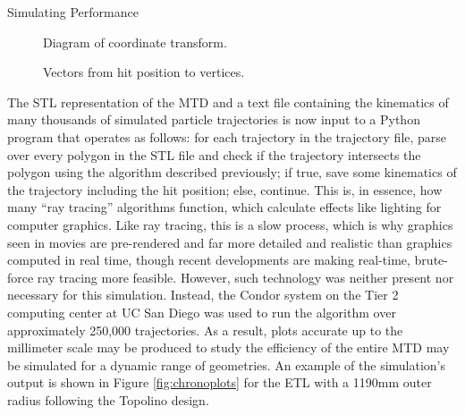 \begin{section}{Simulating Performance}
\begin{figure}[htb]
\begin{center}

\subfloat[Original]      {

}\quad
\subfloat[Primed]      {

}

\end{center}
\caption{Diagram of coordinate transform.}
\end{figure}

\begin{figure}[htb]
\label{fig:vectors}
\begin{center}

\subfloat[Inside]      {

}\quad
\subfloat[Outside]      {

}

\end{center}
\caption{Vectors from hit position to vertices.}
\label{fig:setup}
\end{figure}

The STL representation of the MTD and a text file containing the kinematics of many thousands of simulated particle trajectories is now input to a Python program that operates as follows: for each trajectory in the trajectory file, parse over every polygon in the STL file and check if the trajectory intersects the polygon using the algorithm described previously; if true, save some kinematics of the trajectory including the hit position; else, continue. This is, in essence, how many ``ray tracing'' algorithms function\cite{raytrace}, which calculate effects like lighting for computer graphics. Like ray tracing, this is a slow process, which is why graphics seen in movies are pre-rendered and far more detailed and realistic than graphics computed in real time, though recent developments are making real-time, brute-force ray tracing more feasible. However, such technology was neither present nor necessary for this simulation. Instead, the Condor\cite{condor} system on the Tier 2 computing center at UC San Diego was used to run the algorithm over approximately 250,000 trajectories. As a result, plots accurate up to the millimeter scale may be produced to study the efficiency of the entire MTD may be simulated for a dynamic range of geometries. An example of the simulation's output is shown in Figure \ref{fig:chronoplots} for the ETL with a 1190mm outer radius following the Topolino design.


\end{section}
